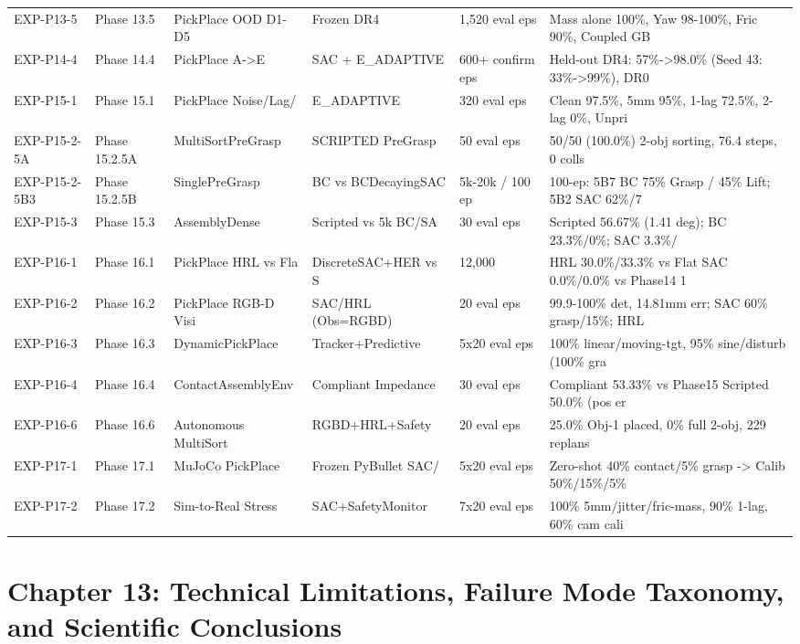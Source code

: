 \documentclass[11pt,a4paper,oneside]{book}
\begin{document}
\begin{longtable}{l l l l l l}
EXP-P13-5 & Phase 13.5 & PickPlace OOD D1-D5 & Frozen DR4 & 1,520 eval eps & Mass alone 100\%, Yaw 98-100\%, Fric 90\%, Coupled GB \\
EXP-P14-4 & Phase 14.4 & PickPlace A->E & SAC + E\_ADAPTIVE & 600+ confirm eps & Held-out DR4: 57\%->98.0\% (Seed 43: 33\%->99\%), DR0  \\
EXP-P15-1 & Phase 15.1 & PickPlace Noise/Lag/ & E\_ADAPTIVE & 320 eval eps & Clean 97.5\%, 5mm 95\%, 1-lag 72.5\%, 2-lag 0\%, Unpri \\
EXP-P15-2-5A & Phase 15.2.5A & MultiSortPreGrasp & SCRIPTED PreGrasp & 50 eval eps & 50/50 (100.0\%) 2-obj sorting, 76.4 steps, 0 colls \\
EXP-P15-2-5B3 & Phase 15.2.5B & SinglePreGrasp & BC vs BCDecayingSAC & 5k-20k / 100 ep & 100-ep: 5B7 BC 75\% Grasp / 45\% Lift; 5B2 SAC 62\%/7 \\
EXP-P15-3 & Phase 15.3 & AssemblyDense & Scripted vs 5k BC/SA & 30 eval eps & Scripted 56.67\% (1.41 deg); BC 23.3\%/0\%; SAC 3.3\%/ \\
EXP-P16-1 & Phase 16.1 & PickPlace HRL vs Fla & DiscreteSAC+HER vs S & 12,000 & HRL 30.0\%/33.3\% vs Flat SAC 0.0\%/0.0\% vs Phase14 1 \\
EXP-P16-2 & Phase 16.2 & PickPlace RGB-D Visi & SAC/HRL (Obs=RGBD) & 20 eval eps & 99.9-100\% det, 14.81mm err; SAC 60\% grasp/15\%; HRL \\
EXP-P16-3 & Phase 16.3 & DynamicPickPlace & Tracker+Predictive & 5x20 eval eps & 100\% linear/moving-tgt, 95\% sine/disturb (100\% gra \\
EXP-P16-4 & Phase 16.4 & ContactAssemblyEnv & Compliant Impedance & 30 eval eps & Compliant 53.33\% vs Phase15 Scripted 50.0\% (pos er \\
EXP-P16-6 & Phase 16.6 & Autonomous MultiSort & RGBD+HRL+Safety & 20 eval eps & 25.0\% Obj-1 placed, 0\% full 2-obj, 229 replans \\
EXP-P17-1 & Phase 17.1 & MuJoCo PickPlace & Frozen PyBullet SAC/ & 5x20 eval eps & Zero-shot 40\% contact/5\% grasp -> Calib 50\%/15\%/5\% \\
EXP-P17-2 & Phase 17.2 & Sim-to-Real Stress & SAC+SafetyMonitor & 7x20 eval eps & 100\% 5mm/jitter/fric-mass, 90\% 1-lag, 60\% cam cali \\
\bottomrule \end{longtable}
\chapter{Chapter 13: Technical Limitations, Failure Mode Taxonomy, and Scientific Conclusions}
\end{document}
